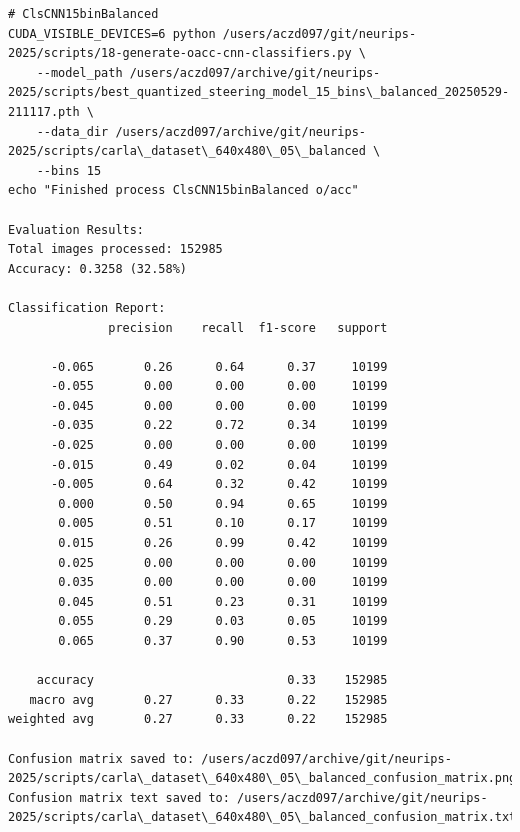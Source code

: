 \begin{verbatim}
# ClsCNN15binBalanced
CUDA_VISIBLE_DEVICES=6 python /users/aczd097/git/neurips-2025/scripts/18-generate-oacc-cnn-classifiers.py \
    --model_path /users/aczd097/archive/git/neurips-2025/scripts/best_quantized_steering_model_15_bins\_balanced_20250529-211117.pth \
    --data_dir /users/aczd097/archive/git/neurips-2025/scripts/carla\_dataset\_640x480\_05\_balanced \
    --bins 15
echo "Finished process ClsCNN15binBalanced o/acc"

Evaluation Results:
Total images processed: 152985
Accuracy: 0.3258 (32.58%)

Classification Report:
              precision    recall  f1-score   support

      -0.065       0.26      0.64      0.37     10199
      -0.055       0.00      0.00      0.00     10199
      -0.045       0.00      0.00      0.00     10199
      -0.035       0.22      0.72      0.34     10199
      -0.025       0.00      0.00      0.00     10199
      -0.015       0.49      0.02      0.04     10199
      -0.005       0.64      0.32      0.42     10199
       0.000       0.50      0.94      0.65     10199
       0.005       0.51      0.10      0.17     10199
       0.015       0.26      0.99      0.42     10199
       0.025       0.00      0.00      0.00     10199
       0.035       0.00      0.00      0.00     10199
       0.045       0.51      0.23      0.31     10199
       0.055       0.29      0.03      0.05     10199
       0.065       0.37      0.90      0.53     10199

    accuracy                           0.33    152985
   macro avg       0.27      0.33      0.22    152985
weighted avg       0.27      0.33      0.22    152985

Confusion matrix saved to: /users/aczd097/archive/git/neurips-2025/scripts/carla\_dataset\_640x480\_05\_balanced_confusion_matrix.png
Confusion matrix text saved to: /users/aczd097/archive/git/neurips-2025/scripts/carla\_dataset\_640x480\_05\_balanced_confusion_matrix.txt


\end{verbatim}
